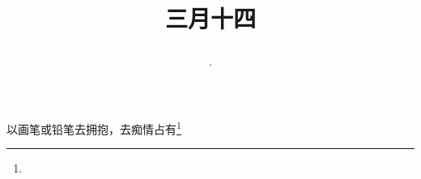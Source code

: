 \title{\date[d=22,m=4,y=2024][year:cn-y,年,month:cn,day:cn,日,·,weekday]·三月十四 }
以画笔或铅笔去拥抱，去痴情占有\footnote{ }

